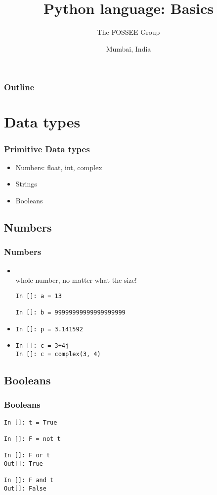 \documentclass[14pt,compress]{beamer}
\title[Basic Python]{Python language: Basics}
\author[FOSSEE Team] {The FOSSEE Group}
\institute[FOSSEE -- IITB] {Department of Aerospace Engineering\\IIT Bombay}
\date[] {Mumbai, India}
\begin{document}
\begin{frame}
  \titlepage
\end{frame}

\begin{frame}
  \frametitle{Outline}
  \tableofcontents
\end{frame}

\section{Data types}

\begin{frame}
  \frametitle{Primitive Data types}
  \begin{itemize}
    \item Numbers: float, int, complex
    \item Strings
    \item Booleans
  \end{itemize}
\end{frame}

\subsection{Numbers}
\begin{frame}[fragile]
  \frametitle{Numbers}
  \begin{itemize}
    \item {}\\ whole number, no matter what the size!
  \begin{lstlisting}
In []: a = 13

In []: b = 99999999999999999999
  \end{lstlisting}
    \item {}
  \begin{lstlisting}
In []: p = 3.141592
  \end{lstlisting}
    \item {}
  \begin{lstlisting}
In []: c = 3+4j
In []: c = complex(3, 4)
  \end{lstlisting}
  \end{itemize}
\end{frame}

\subsection{Booleans}
\begin{frame}[fragile]
  \frametitle{Booleans}
  \begin{lstlisting}
In []: t = True

In []: F = not t

In []: F or t
Out[]: True

In []: F and t
Out[]: False
  \end{lstlisting}
\end{frame}
\end{document}
